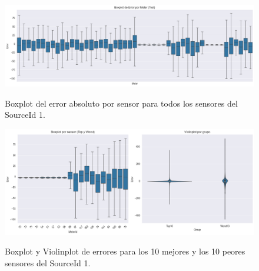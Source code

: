 \begin{figure}[H]
	\centering
	\caption{Boxplot del error absoluto por sensor para todos los sensores del SourceId 1.}
	\includegraphics[width=0.75\linewidth]{includes/cap5/graphs/advanced/sid1_all_meters_error_boxplot.png}
	\label{fig:sid1_boxplot_all}
\end{figure}

\begin{figure}[H]
	\centering
	\caption{Boxplot y Violinplot de errores para los 10 mejores y los 10 peores sensores del SourceId 1.}
	\includegraphics[width=0.75\linewidth]{includes/cap5/graphs/advanced/sid1_10best_10worst_meter_boxplot_violinplot.png}
	\label{fig:sid1_violinplot_best_worst}
\end{figure}

